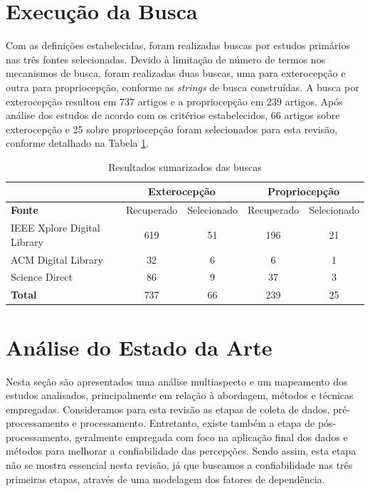 \section{Execução da Busca}

Com as definições estabelecidas, foram realizadas buscas por estudos primários nas três fontes selecionadas. Devido à limitação de número de termos nos mecanismos de busca, foram realizadas duas buscas, uma para exterocepção e outra para propriocepção, conforme as \textit{strings} de busca construídas. A busca por exterocepção resultou em 737 artigos e a propriocepção em 239 artigos. Após análise dos estudos de acordo com os critérios estabelecidos, 66 artigos sobre exterocepção e 25 sobre propriocepção foram selecionados para esta revisão, conforme detalhado na Tabela \ref{tabela:resultados_sumarizados_busca}. 

\begin{table}[h]
    \caption{Resultados sumarizados das buscas}
    \label{tabela:resultados_sumarizados_busca}
    \centering
    \small
    \begin{tabular}{lcccc}
    \cmidrule(l){2-5} & \multicolumn{2}{c}{\textbf{Exterocepção}} & \multicolumn{2}{c}{\textbf{Propriocepção}} \\ \midrule
    \textbf{Fonte} & Recuperado & Selecionado & Recuperado & Selecionado \\ \midrule
    IEEE Xplore Digital Library & 619 & 51 & 196 & 21 \\ \midrule
    ACM Digital Library & 32 & 6 & 6 & 1 \\ \midrule
    Science Direct & 86 & 9 & 37 & 3 \\ \midrule
    \textbf{Total} & 737 & 66 & 239 & 25 \\ \bottomrule
    \end{tabular}
\end{table}

\section{Análise do Estado da Arte}

Nesta seção são apresentados uma análise multiaspecto e um mapeamento dos estudos analisados, principalmente em relação à abordagem, métodos e técnicas empregadas. Consideramos para esta revisão as etapas de coleta de dados, pré-processamento e processamento. Entretanto, existe também a etapa de pós-processamento, geralmente empregada com foco na aplicação final dos dados e métodos para melhorar a confiabilidade das percepções. Sendo assim, esta etapa não se mostra essencial nesta revisão, já que buscamos a confiabilidade nas três primeiras etapas, através de uma modelagem dos fatores de dependência. 

